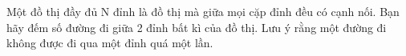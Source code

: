 Một đồ thị đầy đủ N đỉnh là đồ thị mà giữa mọi cặp đỉnh đều có cạnh nối. Bạn hãy đếm số đường đi giữa 2 đỉnh bất kì của đồ thị. Lưu ý rằng một đường đi không được đi qua một đỉnh quá một lần.

\